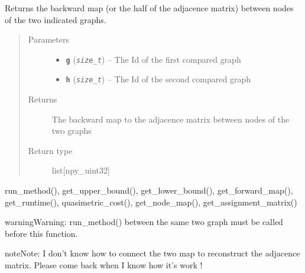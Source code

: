 \documentclass[letterpaper,10pt,english]{sphinxmanual}
\begin{document}
\begin{fulllineitems}
\label{doc:gedlibpy.get_backward_map}
Returns the backward map (or the half of the adjacence matrix) between nodes of the two indicated graphs.
\begin{quote}\begin{description}
\item[{Parameters}] \leavevmode\begin{itemize}
\item {} 
\textbf{\texttt{g}} (\emph{\texttt{size\_t}}) -- The Id of the first compared graph

\item {} 
\textbf{\texttt{h}} (\emph{\texttt{size\_t}}) -- The Id of the second compared graph

\end{itemize}

\item[{Returns}] \leavevmode
The backward map to the adjacence matrix between nodes of the two graphs

\item[{Return type}] \leavevmode
list{[}npy\_uint32{]}

\end{description}\end{quote}




run\_method(), get\_upper\_bound(), get\_lower\_bound(),  get\_forward\_map(), get\_runtime(), quasimetric\_cost(), get\_node\_map(), get\_assignment\_matrix()



\begin{notice}{warning}{Warning:}
run\_method() between the same two graph must be called before this function.
\end{notice}

\begin{notice}{note}{Note:}
I don't know how to connect the two map to reconstruct the adjacence matrix. Please come back when I know how it's work !
\end{notice}

\end{fulllineitems}

\end{document}
